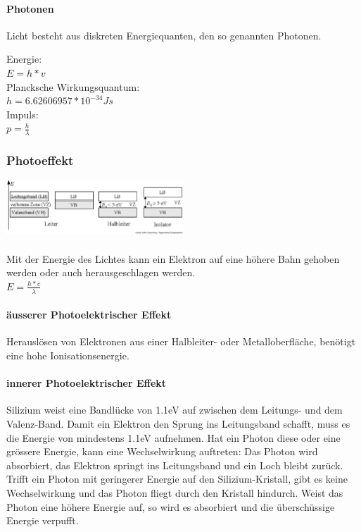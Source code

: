 \paragraph {Photonen}
Licht besteht aus diskreten Energiequanten, den so genannten Photonen.
\begin{multicols}{3}
Energie: \\ $E = h * v$ \\
Plancksche Wirkungsquantum: \\ $h = 6.62606957 * 10^{-34} Js$ \\
Impuls: \\ $p = \frac {h}{\lambda}$ 
\end{multicols}

\subsubsection {Photoeffekt}
\begin{multicols}{4}
\includegraphics[width=0.5\textwidth]{images/Leitungsband} \\ \columnbreak 
\ \\ \vfill \columnbreak 
Mit der Energie des Lichtes kann ein Elektron auf eine höhere Bahn gehoben werden oder auch herausgeschlagen werden. \\ 
$E = \frac{h * c}{\lambda}$
\end{multicols}

\paragraph{äusserer Photoelektrischer Effekt}
Herauslösen von Elektronen aus einer Halbleiter- oder Metalloberfläche, benötigt eine hohe Ionisationsenergie.

\paragraph{innerer Photoelektrischer Effekt}
Silizium weist eine Bandlücke von 1.1eV auf zwischen dem Leitungs- und dem Valenz-Band. Damit ein Elektron den Sprung ins Leitungsband schafft, muss es die Energie von mindestens 1.1eV aufnehmen. Hat ein Photon diese oder eine grössere Energie, kann eine Wechselwirkung auftreten: Das Photon wird absorbiert, das Elektron springt ins Leitungsband und ein Loch bleibt zurück. Trifft ein Photon mit geringerer Energie auf den Silizium-Kristall, gibt es keine Wechselwirkung und das Photon fliegt durch den Kristall hindurch. Weist das Photon eine höhere Energie auf, so wird es absorbiert und die überschüssige Energie verpufft.

